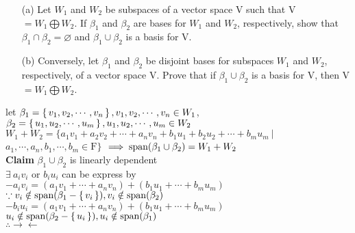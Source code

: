 \begin{enumerate}
	\item[(a)] Let $W_1$ and $W_2$ be subspaces of a vector space V such that V $= W_1 \bigoplus W_2$. If $\beta_{1}$ and $\beta_{2}$ are bases for $W_1$ and $W_2$, respectively, show that $\beta_1 \cap \beta_2 = \varnothing$ and $\beta_1 \cup \beta_2$ is a basis for V.
	\item[(b)] Conversely, let $\beta_1$ and $\beta_2$ be disjoint bases for subspaces $W_1$ and $W_2$, respectively, of a vector space V. Prove that if $\beta_1 \cup \beta_2$ is a basis for V, then V $= W_1 \bigoplus W_2$.
\end{enumerate}

\begin{tcolorbox}
	\begin{solution}
		let $\beta_1 = \left\{ \,v_1,v_2,\cdots,v_n \,\right\},v_1,v_2,\cdots,v_n \in W_1$,\\ $\beta_2 = \left\{ \,u_1,u_2,\cdots,u_m \,\right\},u_1,u_2,\cdots,u_m \in W_2$\\
		$W_1 + W_2 = \{a_1v_1+a_2v_2+\cdots+a_nv_n+b_1u_1+b_2u_2+\cdots+b_mu_m ~|~  $ \\$a_1,\cdots,a_n,b_1,\cdots,b_m \in \mathrm{F}\} $
		$\implies \text{span($\beta_1 \cup \beta_2$)} = W_1 + W_2$\\
		\textbf{Claim} ${\beta_1 \cup \beta_2}$ is linearly dependent\\
		$\exists~a_iv_i$ or $b_iu_i$ can be express by\\
		$-a_iv_i = (a_1v_1+\cdots+a_nv_n)+(b_1u_1+\cdots+b_mu_m)$ \\
		$\because v_i \notin \text{span($\beta_1-\left\{ \,v_i \,\right\}$)}, v_i \notin \text{span($\beta_2$)}$\\
		$-b_iu_i = (a_1v_1+\cdots+a_nv_n)+(b_1u_1+\cdots+b_mu_m)$ \\
		$u_i \notin \text{span($\beta_2-\left\{ \,u_i \,\right\}$)}, u_i \notin \text{span($\beta_1$)}$\\
		$\therefore \rightarrow\leftarrow$
		
	\end{solution}
\end{tcolorbox}
